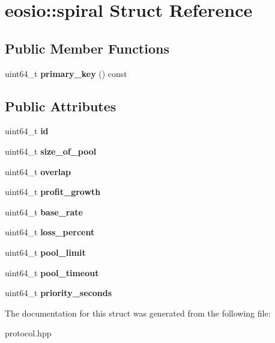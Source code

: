 \hypertarget{structeosio_1_1spiral}{}\section{eosio\+:\+:spiral Struct Reference}
\label{structeosio_1_1spiral}
\subsection*{Public Member Functions}
\begin{DoxyCompactItemize}
\item 
\mbox{\label{structeosio_1_1spiral_a21f0567aa49356e28036d8cf6c1ff79f}} 
uint64\+\_\+t {\bfseries primary\+\_\+key} () const
\end{DoxyCompactItemize}
\subsection*{Public Attributes}
\begin{DoxyCompactItemize}
\item 
\mbox{\label{structeosio_1_1spiral_a61ebae8c25f7c4c7d2be72d6f0fed5d8}} 
uint64\+\_\+t {\bfseries id}
\item 
\mbox{\label{structeosio_1_1spiral_a4123371627ed960eb1e09aa20329b2be}} 
uint64\+\_\+t {\bfseries size\+\_\+of\+\_\+pool}
\item 
\mbox{\label{structeosio_1_1spiral_a090332a0c0025c7f7b51ab7d5f584b48}} 
uint64\+\_\+t {\bfseries overlap}
\item 
\mbox{\label{structeosio_1_1spiral_afed09ff5d3c6e80424341af4b3372a7c}} 
uint64\+\_\+t {\bfseries profit\+\_\+growth}
\item 
\mbox{\label{structeosio_1_1spiral_a1b8837ba326a7721c76d4da43ead9702}} 
uint64\+\_\+t {\bfseries base\+\_\+rate}
\item 
\mbox{\label{structeosio_1_1spiral_a494dfca6774c6f9d48f30969aef69510}} 
uint64\+\_\+t {\bfseries loss\+\_\+percent}
\item 
\mbox{\label{structeosio_1_1spiral_a3516f19930c6fa349e5ca00e9a120a17}} 
uint64\+\_\+t {\bfseries pool\+\_\+limit}
\item 
\mbox{\label{structeosio_1_1spiral_ac7590a527bb272afbbeca356b56e4ca0}} 
uint64\+\_\+t {\bfseries pool\+\_\+timeout}
\item 
\mbox{\label{structeosio_1_1spiral_a7095d64ee94ecb91926d3a191ae80dcf}} 
uint64\+\_\+t {\bfseries priority\+\_\+seconds}
\end{DoxyCompactItemize}


The documentation for this struct was generated from the following file\+:\begin{DoxyCompactItemize}
\item 
protocol.\+hpp\end{DoxyCompactItemize}
